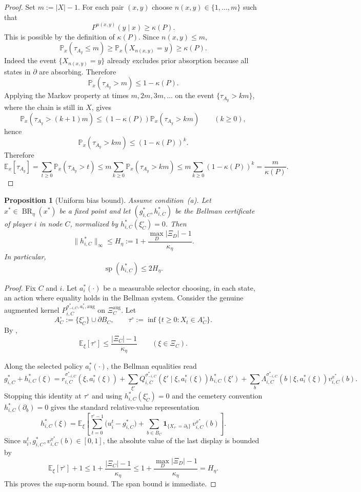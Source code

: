 \documentclass[12pt]{article}
\newtheorem{proposition}[theorem]{Proposition}
\theoremstyle{definition}
\newcommand{\E}{\mathbb{E}}
\newcommand{\Pb}{\mathbb{P}}
\newcommand{\1}{\mathbf{1}}
\DeclareMathOperator{\spn}{sp}
\DeclareMathOperator{\BR}{BR}
\begin{document}
\begin{proof}
Set $m:=|X|-1$. For each pair $(x,y)$ choose
$n(x,y)\in\{1,\dots,m\}$ such that
\[
P^{n(x,y)}(y\mid x)\ge \kappa(P).
\]
This is possible by the definition of $\kappa(P)$. Since $n(x,y)\le m$,
\[
\Pb_x(\tau_{A_y}\le m)\ge \Pb_x(X_{n(x,y)}=y)\ge \kappa(P).
\]
Indeed the event $\{X_{n(x,y)}=y\}$ already excludes prior absorption because all
states in $\partial$ are absorbing. Therefore
\[
\Pb_x(\tau_{A_y}>m)\le 1-\kappa(P).
\]
Applying the Markov property at times $m,2m,3m,\dots$ on the event
$\{\tau_{A_y}>km\}$, where the chain is still in $X$, gives
\[
\Pb_x(\tau_{A_y}>(k+1)m)\le (1-\kappa(P))\Pb_x(\tau_{A_y}>km)
\qquad (k\ge 0),
\]
hence
\[
\Pb_x(\tau_{A_y}>km)\le (1-\kappa(P))^k.
\]
Therefore
\[
\E_x[\tau_{A_y}]
=
\sum_{t\ge 0}\Pb_x(\tau_{A_y}>t)
\le
m\sum_{k\ge 0}\Pb_x(\tau_{A_y}>km)
\le
m\sum_{k\ge 0}(1-\kappa(P))^k
=
\frac{m}{\kappa(P)}.
\]
\end{proof}


\begin{proposition}[Uniform bias bound]
\label{prop:bias-span}
Assume condition~\textnormal{(a)}. Let $x^*\in\BR_\eta(x^*)$ be a fixed point and
let $(g_{i,C}^*,h_{i,C}^*)$ be the Bellman certificate of player $i$ in node $C$,
normalized by $h_{i,C}^*(\xi_C^\circ)=0$. Then
\[
\|h_{i,C}^*\|_\infty\le H_\eta:=1+\frac{\max_D|\Xi_D|-1}{\kappa_\eta}.
\]
In particular,
\[
\spn(h_{i,C}^*)\le 2H_\eta.
\]
\end{proposition}

\begin{proof}
Fix $C$ and $i$. Let $a_i^*(\cdot)$ be a measurable selector choosing, in each
state, an action where equality holds in the Bellman system. Consider the genuine
augmented kernel
$P_{i,C}^{\sigma_{-i,C}^*,a_i^*,\mathrm{aug}}$ on
$\Xi_C^{\mathrm{aug}}$. Let
\[
A_C^\circ:=\{\xi_C^\circ\}\cup\partial B_C,
\qquad
\tau^\circ:=\inf\{t\ge 0:X_t\in A_C^\circ\}.
\]
By ,
\[
\E_\xi[\tau^\circ]\le \frac{|\Xi_C|-1}{\kappa_\eta}
\qquad (\xi\in\Xi_C).
\]

Along the selected policy $a_i^*(\cdot)$, the Bellman equalities read
\[
g_{i,C}^*+h_{i,C}^*(\xi)
=
r_{i,C}^{\sigma_{-i,C}^*}(\xi,a_i^*(\xi))
+
\sum_{\xi'}Q_{i,C}^{\sigma_{-i,C}^*}(\xi'\mid\xi,a_i^*(\xi))h_{i,C}^*(\xi')
+
\sum_b\Lambda_{i,C}^{\sigma_{-i,C}^*}(b\mid\xi,a_i^*(\xi))v_{i,C}^{x^*}(b).
\]
Stopping this identity at $\tau^\circ$ and using $h_{i,C}^*(\xi_C^\circ)=0$ and
the cemetery convention $h_{i,C}^*(\partial_b)=0$ gives the standard relative-value
representation
\[
h_{i,C}^*(\xi)
=
\E_\xi\!\left[
\sum_{t=0}^{\tau^\circ-1}\bigl(u_i^t-g_{i,C}^*\bigr)
+
\sum_{b\in B_C}\1_{\{X_{\tau^\circ}=\partial_b\}}\,v_{i,C}^{x^*}(b)
\right].
\]
Since $u_i^t,g_{i,C}^*,v_{i,C}^{x^*}(b)\in[0,1]$, the absolute value of the last
display is bounded by
\[
\E_\xi[\tau^\circ] + 1
\le
1+\frac{|\Xi_C|-1}{\kappa_\eta}
\le
1+\frac{\max_D|\Xi_D|-1}{\kappa_\eta}
=
H_\eta.
\]
This proves the sup-norm bound. The span bound is immediate.
\end{proof}
\end{document}
